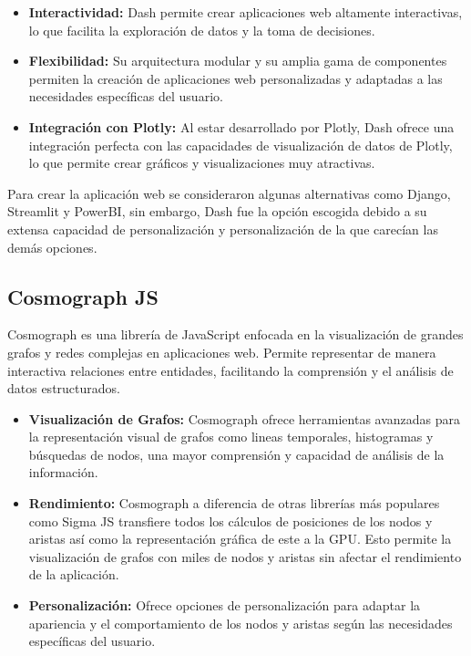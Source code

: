 \begin{itemize}
	\item \textbf{Interactividad:} Dash permite crear aplicaciones web altamente interactivas, lo que facilita la exploración de datos y la toma de decisiones.
	\item \textbf{Flexibilidad:} Su arquitectura modular y su amplia gama de componentes permiten la creación de aplicaciones web personalizadas y adaptadas a las necesidades específicas del usuario.
	\item \textbf{Integración con Plotly:} Al estar desarrollado por Plotly, Dash ofrece una integración perfecta con las capacidades de visualización de datos de Plotly, lo que permite crear gráficos y visualizaciones muy atractivas.
\end{itemize}

Para crear la aplicación web se consideraron algunas alternativas como Django, Streamlit y PowerBI, sin embargo, Dash fue la opción escogida debido a su extensa capacidad de personalización y personalización de la que carecían las demás opciones.

\subsection*{Cosmograph JS}

Cosmograph es una librería de JavaScript enfocada en la visualización de grandes grafos y redes complejas en aplicaciones web. Permite representar de manera interactiva relaciones entre entidades, facilitando la comprensión y el análisis de datos estructurados.

\begin{itemize}
	\item \textbf{Visualización de Grafos:} Cosmograph ofrece herramientas avanzadas para la representación visual de grafos como lineas temporales, histogramas y búsquedas de nodos, una mayor comprensión y capacidad de análisis de la información.

	\item \textbf{Rendimiento:} Cosmograph a diferencia de otras librerías más populares como Sigma JS transfiere todos los cálculos de posiciones de los nodos y aristas así como la representación gráfica de este a la GPU. Esto permite la visualización de grafos con miles de nodos y aristas sin afectar el rendimiento de la aplicación.

	\item \textbf{Personalización:} Ofrece opciones de personalización para adaptar la apariencia y el comportamiento de los nodos y aristas según las necesidades específicas del usuario.

\end{itemize}

